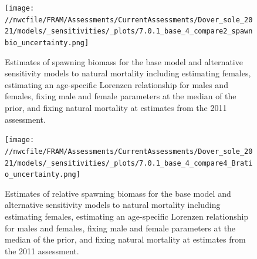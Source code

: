 \documentclass[11pt,
  english,
  a4paper,
]{article}
\begin{document}
\tagmcend\tagstructend


\begin{figure}
\centering
\texttt{[image: //nwcfile/FRAM/Assessments/CurrentAssessments/Dover\_sole\_2021/models/\_sensitivities/\_plots/7.0.1\_base\_4\_compare2\_spawnbio\_uncertainty.png]}
\caption{Estimates of spawning biomass for the base model and alternative sensitivity models to natural mortality including estimating females, estimating an age-specific Lorenzen relationship for males and females, fixing male and female parameters at the median of the prior, and fixing natural mortality at estimates from the 2011 assessment.\label{fig:sens-m-ssb}}
\end{figure}

\tagmcend\tagstructend


\begin{figure}
\centering
\texttt{[image: //nwcfile/FRAM/Assessments/CurrentAssessments/Dover\_sole\_2021/models/\_sensitivities/\_plots/7.0.1\_base\_4\_compare4\_Bratio\_uncertainty.png]}
\caption{Estimates of relative spawning biomass for the base model and alternative sensitivity models to natural mortality including estimating females, estimating an age-specific Lorenzen relationship for males and females, fixing male and female parameters at the median of the prior, and fixing natural mortality at estimates from the 2011 assessment.\label{fig:sens-m-relssb}}
\end{figure}

\tagmcend\tagstructend

\end{document}
